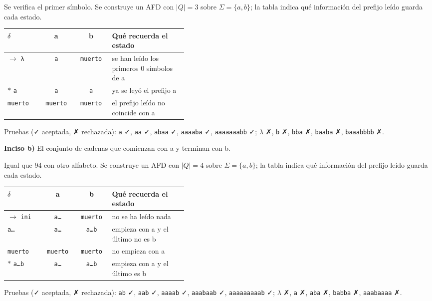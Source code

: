 \documentclass[11pt]{article}
\begin{document}
Se verifica el primer símbolo. Se construye un AFD con $|Q| = 3$ sobre $\Sigma = \{a, b\}$; la tabla indica qué información del prefijo leído guarda cada estado.
\begin{center}\small\begin{tabular}{lccp{0.42\linewidth}}\toprule
$\delta$ & a & b & Qué recuerda el estado \\\midrule
$\to$ \texttt{λ} & \texttt{a} & \texttt{muerto} & se han leído los primeros 0 símbolos de a \\
$*$ \texttt{a} & \texttt{a} & \texttt{a} & ya se leyó el prefijo a \\
 \texttt{muerto} & \texttt{muerto} & \texttt{muerto} & el prefijo leído no coincide con a \\
\bottomrule\end{tabular}\end{center}
Pruebas (✓ aceptada, ✗ rechazada): \texttt{a} ✓, \texttt{aa} ✓, \texttt{abaa} ✓, \texttt{aaaaba} ✓, \texttt{aaaaaaabb} ✓; $\lambda$ ✗, \texttt{b} ✗, \texttt{bba} ✗, \texttt{baaba} ✗, \texttt{baaabbbb} ✗.


\textbf{Inciso b)} El conjunto de cadenas que comienzan con a y terminan con b.

Igual que 94 con otro alfabeto. Se construye un AFD con $|Q| = 4$ sobre $\Sigma = \{a, b\}$; la tabla indica qué información del prefijo leído guarda cada estado.
\begin{center}\small\begin{tabular}{lccp{0.42\linewidth}}\toprule
$\delta$ & a & b & Qué recuerda el estado \\\midrule
$\to$ \texttt{ini} & \texttt{a…} & \texttt{muerto} & no se ha leído nada \\
 \texttt{a…} & \texttt{a…} & \texttt{a…b} & empieza con a y el último no es b \\
 \texttt{muerto} & \texttt{muerto} & \texttt{muerto} & no empieza con a \\
$*$ \texttt{a…b} & \texttt{a…} & \texttt{a…b} & empieza con a y el último es b \\
\bottomrule\end{tabular}\end{center}
Pruebas (✓ aceptada, ✗ rechazada): \texttt{ab} ✓, \texttt{aab} ✓, \texttt{aaaab} ✓, \texttt{aaabaab} ✓, \texttt{aaaaaaaaab} ✓; $\lambda$ ✗, \texttt{a} ✗, \texttt{aba} ✗, \texttt{babba} ✗, \texttt{aaabaaaa} ✗.
\end{document}
